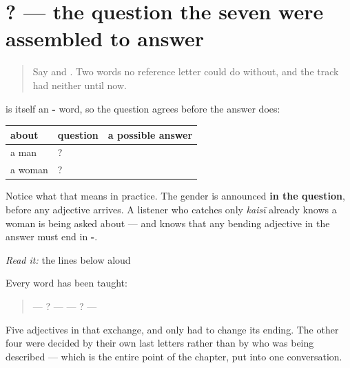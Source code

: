 \section[\texorpdfstring{\hi{वह} \hi{कैसी} \hi{है}? (vah kaisī hai?)}{वह कैसी है? (vah kaisī hai?)}]{  ? — the question the seven were assembled to answer}

\label{lesson:HI-C83-sintesis-svabhaav}



\begin{quote}
Say \textbf{} and \textbf{}. Two words no reference letter could do without, and the track had neither until now.
\end{quote}

\begin{grammarlens}[title={Grammar Lens: the question word bends too}]
\textbf{} is itself an \textbf{-} word, so the question agrees before the answer does:

\noindent
\begin{tabularx}{\linewidth}{@{}>{\raggedright\arraybackslash}X>{\raggedright\arraybackslash}X>{\raggedright\arraybackslash}X@{}}
\toprule
\textbf{about} & \textbf{question} & \textbf{a possible answer} \\
\midrule
a man & \hi{वह} \hi{कैसा} \hi{है}? & \hi{वह} \hi{गंभीर} \hi{है।} \\
a woman & \hi{वह} \hi{कैसी} \hi{है}? & \hi{वह} \hi{शर्मीली} \hi{है।} \\
\bottomrule
\end{tabularx}

Notice what that means in practice. The gender is announced \textbf{in the question}, before any adjective arrives. A listener who catches only \emph{kaisī} already knows a woman is being asked about — and knows that any bending adjective in the answer must end in \textbf{-}.
\end{grammarlens}

\begin{tcolorbox}[breakable,skin=enhanced,colback=orange!6,colframe=orange!45!black,boxrule=0.5pt,arc=1mm,left=6pt,right=6pt,top=4pt,bottom=4pt,fonttitle=\bfseries,title={Read this}]
\emph{Read it:} the lines below aloud

Every word has been taught:

\begin{quote}
—    ? —           —    ? —       
\end{quote}

Five adjectives in that exchange, and only \textbf{} had to change its ending. The other four were decided by their own last letters rather than by who was being described — which is the entire point of the chapter, put into one conversation.
\end{tcolorbox}

